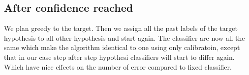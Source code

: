 \subsection{After confidence reached}

We plan greedy to the target. Then we assign all the past labels of the target hypothesis to all other hypothesis and start again. The classifier are now all the same which make the algorithm identical to one using only calibratoin, except that in our case step after step hypothesi classifiers will start to differ again. Which have nice effects on the number of error compared to fixed classifier.